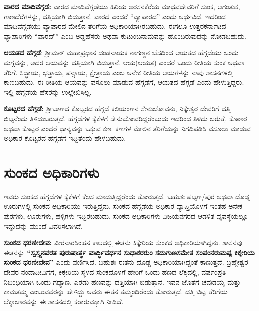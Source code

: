 \vskip -1pt

\textbf{ವಾರದ ಮಾದಿವೆಗ್ಗಡೆ:} ವಾರದ ಮಾದಿವೆಗ್ಗಡೆಯು ಹಿರಿಯ ಅರಸನಕೆರೆಯ ಮಾಧವದೇವರಿಗೆ ಸುಂಕ, ಆಗಂತುಕ, ಗಾಣದೆರೆಗಳನ್ನು, ದತ್ತಿಯಾಗಿ ಬಿಡುತ್ತಾನೆ. ವಾರದ ಎಂದರೆ “ವ್ಯಾಪಾರದ” ಎಂದು ಅರ್ಥವಿದೆ. ಇದರಿಂದ ಮಾದಿವೆಗ್ಗಡೆಯು ವ್ಯಾಪಾರದ ಮೇಲಿನ ತೆರಿಗೆಯ ಅಧಿಕಾರಿಯಾಗಿರಬಹುದು. ಈಗಲೂ ಉತ್ತರಕರ್ನಾಟದ ವ್ಯಾಪಾರಿಗಳು “ವಾರದ್​” ಎಂಬ ಅಡ್ಡಹೆಸರು ಅಥವಾ ಕುಟುಂಬನಾಮವನ್ನು ಹೊಂದಿರುವುದನ್ನು ನೋಡಬಹುದು.

\vskip -1pt

\textbf{ಆಯತದ ಹೆಗ್ಗಡೆ}: ಶ‍್ರೀಮನ್​ ಮಹಾಪ್ರಧಾನ ದಂಡನಾಯಕ ನಾಗಣ್ಣನ ಬೆಸದಿಂದ ಆಯತದ ಹೆಗ್ಗಡೆಯು ಒಂದು ಮಗ್ಗವನ್ನು, ಅದರ ಆಯವನ್ನು ದತ್ತಿಯಾಗಿ ಬಿಡುತ್ತಾನೆ. ಆಯ(ಆಯತ) ಎಂದರೆ ಒಂದು ರೀತಿಯ ಸುಂಕ ಅಥವಾ ತೆರಿಗೆ. ಸಿದ್ಧಾಯ, ಭತ್ತಾಯ, ಪನ್ನಾಯ, ಕ್ಷೇತ್ರಾಯ ಎಂಬ ಅನೇಕ ರೀತಿಯ ಆಯಗಳನ್ನು ನಾವು ಶಾಸನಗಳಲ್ಲಿ ಕಾಣಬಹುದು. ಈ ರೀತಿಯ ಆಯವನ್ನು ವಸೂಲು ಮಾಡುವ ಹೆಗ್ಗಡೆಗೆ, ಆಯತದ ಹೆಗ್ಗಡೆ ಎಂದು ಹೇಳುತ್ತಿದ್ದರು. ಇಲ್ಲಿ ಹೆಗ್ಗಡೆಯ ಹೆಸರನ್ನು ಉಲ್ಲೇಖಿಸಿಲ್ಲ.

\vskip -1pt

\textbf{ಕೊಟ್ಟರದ ಹೆಗ್ಗಡೆ: }ಶ‍್ರೀಬಾಣದ ಕೊಟ್ಟರದ ಹೆಗ್ಗಡೆ ಕಲಿಯಂಣನ ಸೇನುಬೋವನು, ನಿಕ್ಕೇಶ್ವರ ದೇವರಿಗೆ ದತ್ತಿ ಬಿಟ್ಟನೆಂದು ತಿಳಿದುಬರುತ್ತದೆ. ಹೆಗ್ಗಡೆಗಳ ಕೈಕೆಳಗೆ ಸೇನುಬೋವರಿದ್ದರೆಂಬುದು ಇದರಿಂದ ತಿಳಿದು ಬರುತ್ತೆ. ಕೊಠಾರ ಅಥವಾ ಕೊಟ್ಟರ ಎಂದರೆ ಧಾನ್ಯವನ್ನು ಒಕ್ಕುವ ಕಣ. ಕಣಗಳ ಮೇಲಿನ ತೆರಿಗೆಯನ್ನು ನಿಗದಿಪಡಿಸಿ ವಸೂಲು ಮಾಡುವ ಅಧಿಕಾರ ಕೊಟ್ಟರದ ಹೆಗ್ಗಡೆಗೆ ಇದ್ದಿತೆಂದು ಹೇಳಬಹುದು.

\vskip -5pt

\section{ಸುಂಕದ ಅಧಿಕಾರಿಗಳು}

\vskip -3pt

ಇವರು ಸುಂಕದ ಹೆಗ್ಗಡೆಗಳ ಕೈಕೆಳಗೆ ಕೆಲಸ ಮಾಡುತ್ತಿದ್ದರೆಂದು ತೋರುತ್ತದೆ. ಬಹುಶಃ ಪಟ್ಟಣ/ಪುರ ಅಥವಾ ದೊಡ್ಡ ಊರುಗಳಲ್ಲಿ ಸುಂಕದ ಅಧಿಕಾರಿಯು ಇರುತ್ತಿದ್ದನು. ಸುಂಕದ ಹೆಗ್ಗಡೆಯ ಅಧಿಕಾರ ವ್ಯಾಪ್ತಿಯೊಳಗೆ ಇಂತಹ ಅನೇಕ ಪುರಗಳು, ಊರುಗಳು, ಹಳ್ಳಿಗಳು ಇದ್ದಿರಬಹುದು. ಸುಂಕದ ಅಧಿಕಾರಿಗಳು ವಿಜಯನಗರದ ಆಡಳಿತ ವ್ಯವಸ್ಥೆಯಲ್ಲೂ ಇದ್ದುದನ್ನು ಮುಂದೆ ವಿವರಿಸಲಾಗಿದೆ.

\textbf{ಸುಂಕದ ಧರಣೀದೇವ:} ವೀರನಾರಸಿಂಹನ ಕಾಲದಲ್ಲಿ ಈತನು ಕಿಕ್ಕೇರಿಯ ಸುಂಕದ ಅಧಿಕಾರಿಯಾಗಿದ್ದನು. ಶಾಸನವು ಈತನನ್ನು \textbf{“ಸ್ವಸ್ತ್ಯನವರತ ಪುರುಷಾರ್ತ್ಥ ವಾರ್ದ್ಧಿವರ್ಧನ ಸುಧಾಕರರುಂ ಸದುಗುಣಸಮೇತ ಸಂಪಂನರುಮಪ್ಪ ಕಿಕ್ಕೇರಿಯ ಸುಂಕದ ಧರಣೀದೇವ”} ಎಂದು ವರ್ಣಿಸಿದೆ. ಬಹುಶಃ ಈತನು ದೊಡ್ಡ ಅಧಿಕಾರಿಯಾಗಿದ್ದಂತೆ ಕಾಣುತ್ತದೆ. ಬ್ರಹ್ಮೇಶ್ವರ ದೇವರ ನಂದಾದೀವಿಗೆಗೆ, ಕಿಕ್ಕೇರಿಯ ಸ್ಥಳದ ಸುಂಕದೊಳಗೆ ಹೇರಿಗೆ ಒಂದು ಹಣದ ಲೆಕ್ಕದಲ್ಲಿ, ವರ್ಷಂಪ್ರತಿ ನಿಬಂಧಿಯಾಗಿ ಒಂದು ಗದ್ಯಾಣ, ಎರಡು ಹಣವನ್ನು ದತ್ತಿಯಾಗಿ ಬಿಡುತ್ತಾನೆ. ಇವನ ಜೊತೆಗೆ ಚವುಡಯ್ಯ ಮತ್ತು ಕಾಮತಮ್ಮ ಎಂಬುವವರನ್ನು ಹೇಳಿದ್ದು ಅವರು ಈತನ ತಮ್ಮಂದಿರೆಂದು ತೋರುತ್ತದೆ. ದತ್ತಿ ಬಿಟ್ಟ ತೆರಿಗೆಯ ಲೆಕ್ಕಾಚಾರವನ್ನು ಈ ಶಾಸನದಲ್ಲಿ ಕರಾರುವಕ್ಕಾಗಿ ನೀಡಿದೆ.

